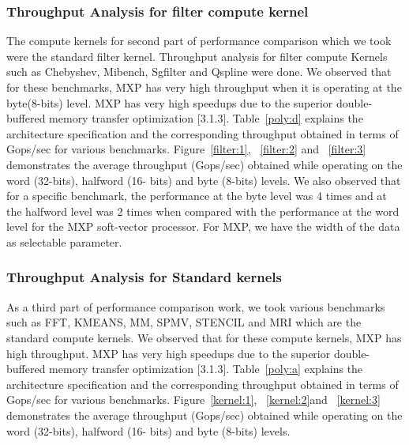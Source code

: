 





\subsubsection{Throughput Analysis for filter compute kernel}

The compute kernels for second part of performance comparison which we took were the standard filter kernel. Throughput analysis for filter compute Kernels such as Chebyshev, Mibench, Sgfilter and Qspline were done.
We observed that for these benchmarks, MXP has very high throughput when it is operating at the byte(8-bits) level. MXP has very high speedups due to the superior double-buffered memory transfer optimization [3.1.3]. Table~\ref{poly:d} explains the architecture specification and the corresponding throughput obtained in terms of Gops/sec for various benchmarks. Figure~\ref{filter:1}, ~\ref{filter:2} and ~\ref{filter:3} demonstrates the average throughput (Gops/sec) obtained while operating on the word (32-bits), halfword (16- bits) and byte (8-bits) levels.
 We also observed that for a specific benchmark, the performance at the byte level was 4 times and at the halfword level was 2 times when compared with the performance at the word level for the MXP soft-vector processor. For MXP, we have the width of the data as selectable parameter.








\subsubsection{Throughput Analysis for Standard kernels}

As a third part of performance comparison work, we took various benchmarks such as FFT, KMEANS, MM, SPMV, STENCIL and MRI which are the standard compute kernels. We observed that for these compute kernels, MXP has high throughput. MXP has very high speedups due to the superior double-buffered memory transfer optimization [3.1.3]. Table~\ref{poly:a} explains the architecture specification and the corresponding throughput obtained in terms of Gops/sec for various benchmarks. Figure~\ref{kernel:1}, ~\ref{kernel:2}and ~\ref{kernel:3} demonstrates the average throughput (Gops/sec) obtained while operating on the word (32-bits), halfword (16- bits) and byte (8-bits) levels.

